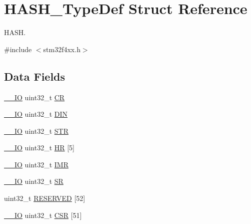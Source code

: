 \hypertarget{struct_h_a_s_h___type_def}{}\section{H\+A\+S\+H\+\_\+\+Type\+Def Struct Reference}
\label{struct_h_a_s_h___type_def}


H\+A\+SH.  




{\ttfamily \#include $<$stm32f4xx.\+h$>$}

\subsection*{Data Fields}
\begin{DoxyCompactItemize}
\item 
\hyperlink{group___c_m_s_i_s__core__definitions_gaec43007d9998a0a0e01faede4133d6be}{\+\_\+\+\_\+\+IO} uint32\+\_\+t \hyperlink{struct_h_a_s_h___type_def_ab40c89c59391aaa9d9a8ec011dd0907a}{CR}
\item 
\hyperlink{group___c_m_s_i_s__core__definitions_gaec43007d9998a0a0e01faede4133d6be}{\+\_\+\+\_\+\+IO} uint32\+\_\+t \hyperlink{struct_h_a_s_h___type_def_a445dd5529e7dc6a4fa2fec4f78da2692}{D\+IN}
\item 
\hyperlink{group___c_m_s_i_s__core__definitions_gaec43007d9998a0a0e01faede4133d6be}{\+\_\+\+\_\+\+IO} uint32\+\_\+t \hyperlink{struct_h_a_s_h___type_def_a7060ac1ed928ee931d7664650f2dcf75}{S\+TR}
\item 
\hyperlink{group___c_m_s_i_s__core__definitions_gaec43007d9998a0a0e01faede4133d6be}{\+\_\+\+\_\+\+IO} uint32\+\_\+t \hyperlink{struct_h_a_s_h___type_def_a02cdb629fbb2bfa63db818ac846847a1}{HR} \mbox{[}5\mbox{]}
\item 
\hyperlink{group___c_m_s_i_s__core__definitions_gaec43007d9998a0a0e01faede4133d6be}{\+\_\+\+\_\+\+IO} uint32\+\_\+t \hyperlink{struct_h_a_s_h___type_def_ae845b86e973b4bf8a33c447c261633f6}{I\+MR}
\item 
\hyperlink{group___c_m_s_i_s__core__definitions_gaec43007d9998a0a0e01faede4133d6be}{\+\_\+\+\_\+\+IO} uint32\+\_\+t \hyperlink{struct_h_a_s_h___type_def_af6aca2bbd40c0fb6df7c3aebe224a360}{SR}
\item 
uint32\+\_\+t \hyperlink{struct_h_a_s_h___type_def_a31675cbea6dc1b5f7de162884a4bb6eb}{R\+E\+S\+E\+R\+V\+ED} \mbox{[}52\mbox{]}
\item 
\hyperlink{group___c_m_s_i_s__core__definitions_gaec43007d9998a0a0e01faede4133d6be}{\+\_\+\+\_\+\+IO} uint32\+\_\+t \hyperlink{struct_h_a_s_h___type_def_a5a72a62805d5497f2b44448edd18f20f}{C\+SR} \mbox{[}51\mbox{]}
\end{DoxyCompactItemize}


